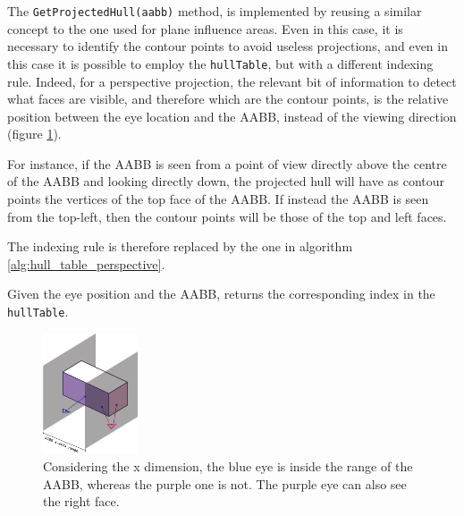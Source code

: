 \documentclass[acmtog, anonymous, review]{acmart}
\begin{document}
The \texttt{GetProjectedHull(aabb)} method, is implemented by reusing a similar concept to the one used for plane influence areas. Even in this case, it is necessary to identify the contour points to avoid useless projections, and even in this case it is possible to employ the \texttt{hullTable}, but with a different indexing rule. Indeed, for a perspective projection, the relevant bit of information to detect what faces are visible, and therefore which are the contour points, is the relative position between the eye location and the AABB, instead of the viewing direction (figure \ref{fig:aabb_view_hull}).

For instance, if the AABB is seen from a point of view directly above the centre of the AABB and looking directly down, the projected hull will have as contour points the vertices of the top face of the AABB. If instead the AABB is seen from the top-left, then the contour points will be those of the top and left faces.

The indexing rule is therefore replaced by the one in algorithm \ref{alg:hull_table_perspective}.

\begin{algorithm}
	\caption{Given the eye position and the AABB, returns the corresponding index in the \texttt{hullTable}.}
  \label{alg:hull_table_perspective}
  \DontPrintSemicolon
\end{algorithm} 

\begin{figure}
  \centering
  \includegraphics[width=0.25\textwidth]{Images/aabb_view_hull.png}
  \caption{Considering the x dimension, the blue eye is inside the range of the AABB, whereas the purple one is not. The purple eye can also see the right face.}
  \label{fig:aabb_view_hull} 
\end{figure}
\end{document}
